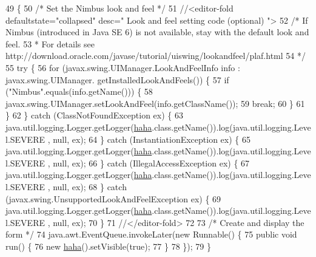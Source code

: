 \begin{DoxyCode}
49                                            \{
50         \textcolor{comment}{/* Set the Nimbus look and feel */}
51         \textcolor{comment}{//<editor-fold defaultstate="collapsed" desc=" Look and feel setting code (optional) ">}
52         \textcolor{comment}{/* If Nimbus (introduced in Java SE 6) is not available, stay with the default look and feel.}
53 \textcolor{comment}{         * For details see http://download.oracle.com/javase/tutorial/uiswing/lookandfeel/plaf.html }
54 \textcolor{comment}{         */}
55         \textcolor{keywordflow}{try} \{
56             \textcolor{keywordflow}{for} (javax.swing.UIManager.LookAndFeelInfo info : javax.swing.UIManager.
      getInstalledLookAndFeels()) \{
57                 \textcolor{keywordflow}{if} (\textcolor{stringliteral}{"Nimbus"}.equals(info.getName())) \{
58                     javax.swing.UIManager.setLookAndFeel(info.getClassName());
59                     \textcolor{keywordflow}{break};
60                 \}
61             \}
62         \} \textcolor{keywordflow}{catch} (ClassNotFoundException ex) \{
63             java.util.logging.Logger.getLogger(\mbox{\hyperlink{class_ejemplo1_1_1haha_a9cbbbf05676d8f04f61af8a8f380fb49}{haha}}.class.getName()).log(java.util.logging.Level.SEVERE
      , null, ex);
64         \} \textcolor{keywordflow}{catch} (InstantiationException ex) \{
65             java.util.logging.Logger.getLogger(\mbox{\hyperlink{class_ejemplo1_1_1haha_a9cbbbf05676d8f04f61af8a8f380fb49}{haha}}.class.getName()).log(java.util.logging.Level.SEVERE
      , null, ex);
66         \} \textcolor{keywordflow}{catch} (IllegalAccessException ex) \{
67             java.util.logging.Logger.getLogger(\mbox{\hyperlink{class_ejemplo1_1_1haha_a9cbbbf05676d8f04f61af8a8f380fb49}{haha}}.class.getName()).log(java.util.logging.Level.SEVERE
      , null, ex);
68         \} \textcolor{keywordflow}{catch} (javax.swing.UnsupportedLookAndFeelException ex) \{
69             java.util.logging.Logger.getLogger(\mbox{\hyperlink{class_ejemplo1_1_1haha_a9cbbbf05676d8f04f61af8a8f380fb49}{haha}}.class.getName()).log(java.util.logging.Level.SEVERE
      , null, ex);
70         \}
71         \textcolor{comment}{//</editor-fold>}
72 
73         \textcolor{comment}{/* Create and display the form */}
74         java.awt.EventQueue.invokeLater(\textcolor{keyword}{new} Runnable() \{
75             \textcolor{keyword}{public} \textcolor{keywordtype}{void} run() \{
76                 \textcolor{keyword}{new} \mbox{\hyperlink{class_ejemplo1_1_1haha_a9cbbbf05676d8f04f61af8a8f380fb49}{haha}}().setVisible(\textcolor{keyword}{true});
77             \}
78         \});
79     \}
\end{DoxyCode}
